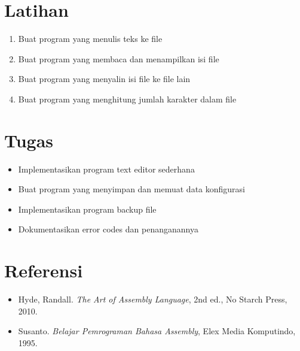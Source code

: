 \section{Latihan}
\begin{enumerate}
\item Buat program yang menulis teks ke file
\item Buat program yang membaca dan menampilkan isi file
\item Buat program yang menyalin isi file ke file lain
\item Buat program yang menghitung jumlah karakter dalam file
\end{enumerate}

\section{Tugas}
\begin{itemize}
\item Implementasikan program text editor sederhana
\item Buat program yang menyimpan dan memuat data konfigurasi
\item Implementasikan program backup file
\item Dokumentasikan error codes dan penanganannya
\end{itemize}

\section{Referensi}
\begin{itemize}
\item Hyde, Randall. \textit{The Art of Assembly Language}, 2nd ed., No Starch Press, 2010.
\item Susanto. \textit{Belajar Pemrograman Bahasa Assembly}, Elex Media Komputindo, 1995.
\end{itemize}

